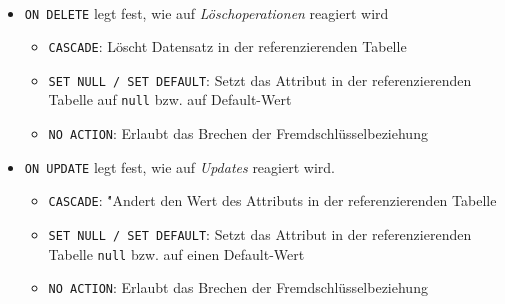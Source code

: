 \begin{frame}[fragile]\frametitle{\insertsection}
\framesubtitle{\insertsubsection}
\\[4pt]
\begin{itemize}
\item \texttt{ON DELETE} legt fest, wie auf \emph{Löschoperationen} reagiert wird
\begin{itemize}
	\item \texttt{CASCADE}: Löscht Datensatz in der referenzierenden Tabelle
	\item \texttt{SET NULL / SET DEFAULT}: Setzt das Attribut in der referenzierenden Tabelle auf \texttt{null} bzw. auf Default-Wert
	\item \texttt{NO ACTION}: Erlaubt das Brechen der Fremdschlüsselbeziehung
\end{itemize}
\item \texttt{ON UPDATE} legt fest, wie auf \emph{Updates} reagiert wird.
\begin{itemize}
	\item \texttt{CASCADE}: \'"Andert den Wert des Attributs in der referenzierenden Tabelle
	\item \texttt{SET NULL / SET DEFAULT}: Setzt das Attribut in der referenzierenden Tabelle \texttt{null} bzw. auf einen Default-Wert
	\item \texttt{NO ACTION}: Erlaubt das Brechen der Fremdschlüsselbeziehung
\end{itemize}
\end{itemize}
\end{frame}



